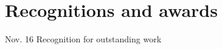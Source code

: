 \documentclass[american]{cv-class}
\begin{document}
\section{Recognitions and awards}
\begin{entrylist}
	\entry
	{Nov. 16}
	{Recognition for outstanding work}
	{\href{https://sitis.com.co/}{ }}
	{\href{https://bit.ly/38BDFnj}{}
	}
	

\end{entrylist}
\end{document}
